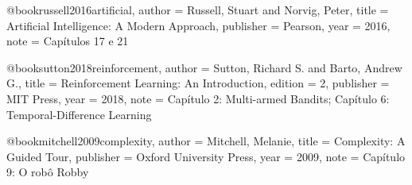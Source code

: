 @book{russell2016artificial,
  author    = {Russell, Stuart and Norvig, Peter},
  title     = {Artificial Intelligence: A Modern Approach},
  publisher = {Pearson},
  year      = {2016},
  note      = {Capítulos 17 e 21}
}

@book{sutton2018reinforcement,
  author    = {Sutton, Richard S. and Barto, Andrew G.},
  title     = {Reinforcement Learning: An Introduction},
  edition   = {2},
  publisher = {MIT Press},
  year      = {2018},
  note      = {Capítulo 2: Multi-armed Bandits; Capítulo 6: Temporal-Difference Learning}
}

@book{mitchell2009complexity,
  author    = {Mitchell, Melanie},
  title     = {Complexity: A Guided Tour},
  publisher = {Oxford University Press},
  year      = {2009},
  note      = {Capítulo 9: O robô Robby}
}